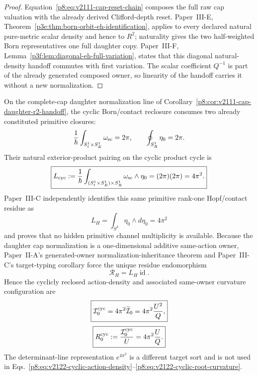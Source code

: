 \documentclass[12pt,a4paper]{article}
\begin{document}
\begin{proof}
Equation~\eqref{p8:eq:v2111-cap-reset-chain} composes the full raw cap
valuation with the already derived Clifford-depth reset.  Paper~III-E,
Theorem~\ref{p3e:thm:born-orbit-eh-identification}, applies to every declared
natural pure-metric scalar density and hence to \(R^2\); naturality gives the
two half-weighted Born representatives one full daughter copy.  Paper~III-F,
Lemma~\ref{p3f:lem:diagonal-eh-full-variation}, states that this diagonal
natural-density handoff commutes with first variation.  The scalar coefficient
\(Q^{-1}\) is part of the already generated composed owner, so linearity of the
handoff carries it without a new normalization.
\end{proof}

\begin{theorem}
\label{p8:thm:v2122-hopf-residue-cyclic-reclosure}
On the complete-cap daughter normalization line of
Corollary~\ref{p8:cor:v2111-cap-daughter-r2-handoff}, the cyclic Born/contact
reclosure consumes two already constituted primitive closures:
\[
 \frac1\hbar\int_{S^1_t\times S^1_E}\omega_{\rm sc}=2\pi,
 \qquad
 \oint_{S^1_R}\eta_0=2\pi.
\]
Their natural exterior-product pairing on the cyclic product cycle is
\begin{equation}
\label{p8:eq:v2122-cyclic-product-pairing}
 \boxed{
 L_{\rm cyc}
 :=\frac1\hbar
 \int_{(S^1_t\times S^1_E)\times S^1_R}
 \omega_{\rm sc}\wedge\eta_0
 =(2\pi)(2\pi)=4\pi^2.}
\end{equation}
Paper~III-C independently identifies this same primitive rank-one Hopf/contact
residue as
\begin{equation}
\label{p8:eq:v2122-hopf-residue}
 \boxed{L_H=\int_{S^3}\eta_0\wedge d\eta_0=4\pi^2}
\end{equation}
and proves that no hidden primitive channel multiplicity is available.
Because the daughter cap normalization is a one-dimensional additive
same-action owner, Paper~II-A's generated-owner normalization-inheritance
theorem and Paper~III-C's target-typing corollary force the unique residue
endomorphism
\[
 \mathscr R_H=L_H\operatorname{id}.
\]
Hence the cyclicly reclosed action-density and associated same-owner curvature
configuration are
\begin{equation}
\label{p8:eq:v2122-cyclic-action-density}
 \boxed{
 \mathcal I_0^{\rm cyc}
 =4\pi^2\widetilde{\mathcal I}_0
 =4\pi^2\frac{U^2}{Q},}
\end{equation}
\begin{equation}
\label{p8:eq:v2122-cyclic-root-curvature}
 \boxed{
 R_0^{\rm cyc}:=\frac{\mathcal I_0^{\rm cyc}}U
 =4\pi^2\frac{U}{Q}.}
\end{equation}
The determinant-line representation \(e^{4\pi^2}\) is a different target sort
and is not used in Eqs.~\eqref{p8:eq:v2122-cyclic-action-density}--\eqref{p8:eq:v2122-cyclic-root-curvature}.
\end{theorem}
\end{document}
